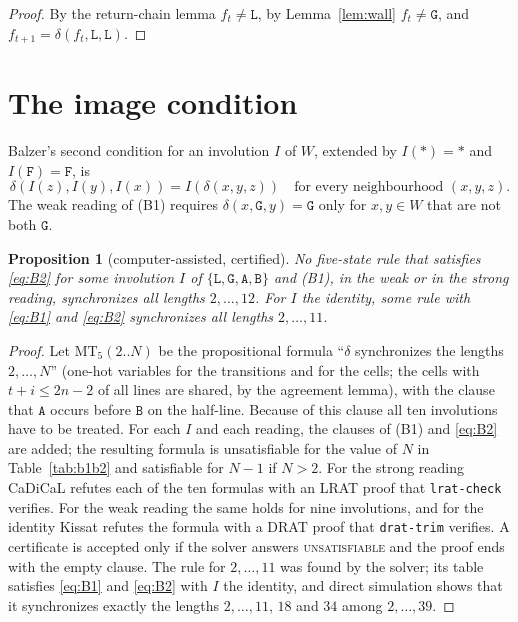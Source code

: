 \documentclass[11pt]{article}
\newtheorem{proposition}[lemma]{Proposition}
\theoremstyle{remark}
\newcommand{\Lq}{\mathtt{L}}\newcommand{\Gq}{\mathtt{G}}\newcommand{\Aq}{\mathtt{A}}\newcommand{\Bq}{\mathtt{B}}\newcommand{\Fq}{\mathtt{F}}
\newcommand{\MT}{\mathrm{MT}}
\begin{document}
\begin{proof}
By the return-chain lemma $f_t\ne\Lq$, by Lemma~\ref{lem:wall} $f_t\ne\Gq$, and
$f_{t+1}=\delta(f_t,\Lq,\Lq)$.
\end{proof}

\section{The image condition}

Balzer's second condition for an involution $I$ of $W$, extended by $I(\ast)=\ast$ and $I(\Fq)=\Fq$, is
\begin{equation}\label{eq:B2}
\delta(I(z),I(y),I(x))=I(\delta(x,y,z))\quad\text{for every neighbourhood }(x,y,z).\tag{B2}
\end{equation}
The weak reading of (B1) requires $\delta(x,\Gq,y)=\Gq$ only for $x,y\in W$ that are not both $\Gq$.

\begin{proposition}[computer-assisted, certified]\label{prop:b1b2}
No five-state rule that satisfies \eqref{eq:B2} for some involution $I$ of $\{\Lq,\Gq,\Aq,\Bq\}$ and (B1), in
the weak or in the strong reading, synchronizes all lengths $2,\dots,12$. For $I$ the identity, some rule with
\eqref{eq:B1} and \eqref{eq:B2} synchronizes all lengths $2,\dots,11$.
\end{proposition}

\begin{proof}
Let $\MT_5(2..N)$ be the propositional formula ``$\delta$ synchronizes the lengths $2,\dots,N$'' (one-hot
variables for the transitions and for the cells; the cells with $t+i\le2n-2$ of all lines are shared, by the
agreement lemma), with the clause that $\Aq$ occurs before $\Bq$ on the half-line. Because of this clause all
ten involutions have to be treated. For each $I$ and each reading, the clauses of (B1) and \eqref{eq:B2} are
added; the resulting formula is unsatisfiable for the value of $N$ in Table~\ref{tab:b1b2} and satisfiable for
$N-1$ if $N>2$. For the strong reading CaDiCaL refutes each of the ten formulas with an LRAT proof that
\texttt{lrat-check} verifies. For the weak reading the same holds for nine involutions, and for the identity
Kissat refutes the formula with a DRAT proof that \texttt{drat-trim} verifies. A certificate is accepted only
if the solver answers \textsc{unsatisfiable} and the proof ends with the empty clause. The rule for
$2,\dots,11$ was found by the solver; its table satisfies \eqref{eq:B1} and \eqref{eq:B2} with $I$ the identity,
and direct simulation shows that it synchronizes exactly the lengths $2,\dots,11$, $18$ and $34$ among
$2,\dots,39$.
\end{proof}
\end{document}
